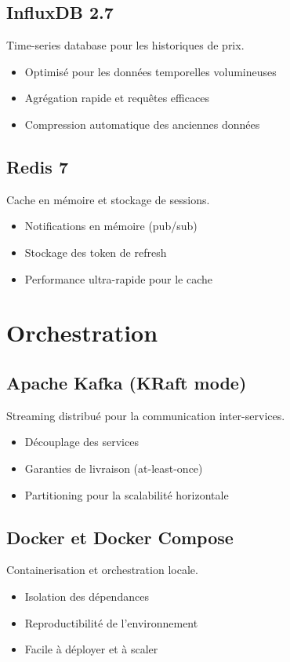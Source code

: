 \documentclass[12pt,a4paper,twoside]{report}
\begin{document}
\subsection{InfluxDB 2.7}
Time-series database pour les historiques de prix.
\begin{itemize}
    \item Optimisé pour les données temporelles volumineuses
    \item Agrégation rapide et requêtes efficaces
    \item Compression automatique des anciennes données
\end{itemize}

\subsection{Redis 7}
Cache en mémoire et stockage de sessions.
\begin{itemize}
    \item Notifications en mémoire (pub/sub)
    \item Stockage des token de refresh
    \item Performance ultra-rapide pour le cache
\end{itemize}

\section{Orchestration}

\subsection{Apache Kafka (KRaft mode)}
Streaming distribué pour la communication inter-services.
\begin{itemize}
    \item Découplage des services
    \item Garanties de livraison (at-least-once)
    \item Partitioning pour la scalabilité horizontale
\end{itemize}

\subsection{Docker et Docker Compose}
Containerisation et orchestration locale.
\begin{itemize}
    \item Isolation des dépendances
    \item Reproductibilité de l'environnement
    \item Facile à déployer et à scaler
\end{itemize}
\end{document}
